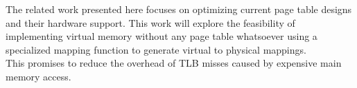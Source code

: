 



\cite{zagieboylo2020cost}


\cite{halbuer2023morsels}



The related work presented here focuses on optimizing current page table designs and their hardware
support. This work will explore the feasibility of implementing virtual memory without any page table whatsoever using a specialized mapping function to generate virtual to physical mappings.\\
This promises to reduce the overhead of TLB misses caused by expensive main memory access.

